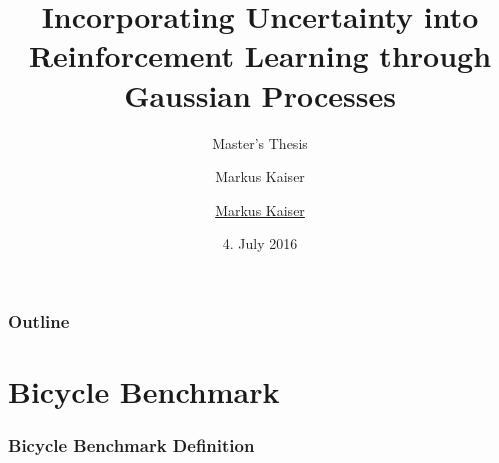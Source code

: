 




\title{Incorporating Uncertainty into Reinforcement Learning through Gaussian Processes}
\author{Markus Kaiser}
\subtitle{Master's Thesis}
\author{\href{mailto:markus.kaiser@in.tum.de}{Markus Kaiser}}
\date{4. July 2016}



\begin{frame}[plain]
    \titlepage
\end{frame}

\begin{frame}
    \frametitle{Outline}

    \tableofcontents
\end{frame}

\section{Bicycle Benchmark}
\begin{frame}
    \frametitle{Bicycle Benchmark Definition}

    \begin{columns}
        \begin{column}[b]{0.5\textwidth}
            \centering
            
        \end{column}
        \begin{column}[b]{0.5\textwidth}
            \centering
            
        \end{column}
    \end{columns}
\end{frame}

